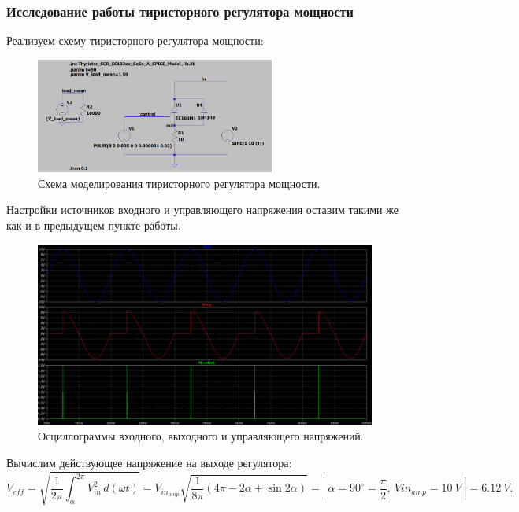 \documentclass[12pt]{article}
\begin{document}
\subsubsection*{Исследование работы тиристорного регулятора мощности}
Реализуем схему тиристорного регулятора мощности:
\begin{figure}[H]
    \centering
    \includegraphics[width=0.7\textwidth]{2_scheme.png}
    \caption{Схема моделирования тиристорного регулятора мощности.}
    \label{fig:2_scheme}
\end{figure}

Настройки источников входного и управляющего напряжения оставим такими же как и в предыдущем пункте работы. \\
\begin{figure}[H]
    \centering
    \includegraphics[width=\textwidth]{2_out_in_control_v.png}
    \caption{Осциллограммы входного, выходного и управляющего напряжений.}
    \label{fig:2_out_in_control_v}
\end{figure}

Вычислим действующее напряжение на выходе регулятора:
\[
    V_{eff} = \sqrt{\frac{1}{2\pi} \int_{\alpha}^{2\pi} V_{in}^2 \,d(\omega t)} = V_{{in}_{amp}} \sqrt{\frac{1}{8\pi}(4\pi - 2\alpha + \sin{2\alpha})} = | \ \alpha=90^\circ=\frac{\pi}{2}, \ V{{in}_{amp}} = 10 \ V \ | = 6.12 \ V.
\]
\end{document}
